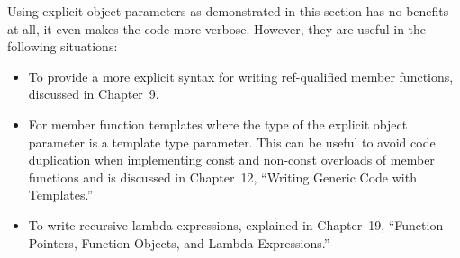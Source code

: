 Using explicit object parameters as demonstrated in this section has no benefits at all, it even makes the code more verbose. However, they are useful in the following situations:

\begin{itemize}
\item
To provide a more explicit syntax for writing ref-qualified member functions, discussed in Chapter 9.

\item
For member function templates where the type of the explicit object parameter is a template type parameter. This can be useful to avoid code duplication when implementing const and non-const overloads of member functions and is discussed in Chapter 12, “Writing Generic Code with Templates.”

\item
To write recursive lambda expressions, explained in Chapter 19, “Function Pointers, Function Objects, and Lambda Expressions.”
\end{itemize}










